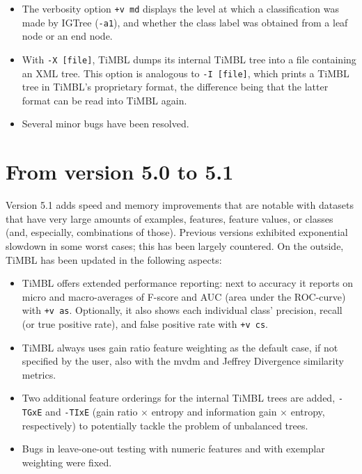 \documentclass{report}
\begin{document}
\begin{itemize}
\item The verbosity option {\tt +v md} displays the level at which a
  classification was made by {\sc IGTree} ({\tt -a1}), and whether the
  class label was obtained from a leaf node or an end node.

\item With {\tt -X [file]}, TiMBL dumps its internal TiMBL tree into a
  file containing an XML tree. This option is analogous to {\tt -I
    [file]}, which prints a TiMBL tree in TiMBL's proprietary format,
  the difference being that the latter format can be read into TiMBL
  again.

\item Several minor bugs have been resolved.

\end{itemize}

\section{From version 5.0 to 5.1}

Version 5.1 adds speed and memory improvements that are notable with
datasets that have very large amounts of examples, features, feature
values, or classes (and, especially, combinations of those). Previous
versions exhibited exponential slowdown in some worst cases; this has
been largely countered. On the outside, TiMBL has been updated in the
following aspects:

\begin{itemize}

\item TiMBL offers extended performance reporting: next to accuracy it
  reports on micro and macro-averages of F-score and AUC (area under
  the ROC-curve) with {\tt +v as}. Optionally, it also shows each
  individual class' precision, recall (or true positive rate), and
  false positive rate with {\tt +v cs}.

\item TiMBL always uses gain ratio feature weighting as the default
  case, if not specified by the user, also with the {\sc mvdm} and
  Jeffrey Divergence similarity metrics.

\item Two additional feature orderings for the internal TiMBL trees
  are added, {\tt -TGxE} and {\tt -TIxE} (gain ratio $\times$ entropy
  and information gain $\times$ entropy, respectively) to potentially
  tackle the problem of unbalanced trees.

\item Bugs in leave-one-out testing with numeric features and with
  exemplar weighting were fixed.

\end{itemize}
\end{document}
